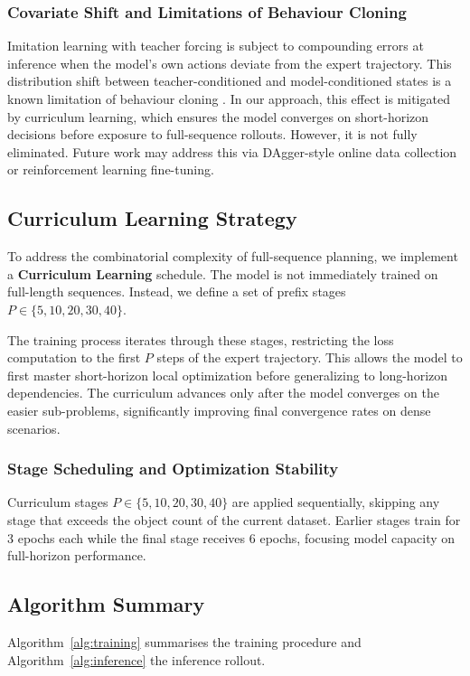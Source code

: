 \documentclass[conference]{IEEEtran}
\begin{document}
\subsubsection{Covariate Shift and Limitations of Behaviour Cloning}
Imitation learning with teacher forcing is subject to compounding errors at inference when the model's own actions deviate from the expert trajectory. This distribution shift between teacher-conditioned and model-conditioned states is a known limitation of behaviour cloning \cite{ross2011dagger}. In our approach, this effect is mitigated by curriculum learning, which ensures the model converges on short-horizon decisions before exposure to full-sequence rollouts. However, it is not fully eliminated. Future work may address this via DAgger-style online data collection \cite{ross2011dagger} or reinforcement learning fine-tuning.

\subsection{Curriculum Learning Strategy}
To address the combinatorial complexity of full-sequence planning, we implement a \textbf{Curriculum Learning} schedule. The model is not immediately trained on full-length sequences. Instead, we define a set of prefix stages $P \in \{5, 10, 20, 30, 40\}$.

The training process iterates through these stages, restricting the loss computation to the first $P$ steps of the expert trajectory. This allows the model to first master short-horizon local optimization before generalizing to long-horizon dependencies. The curriculum advances only after the model converges on the easier sub-problems, significantly improving final convergence rates on dense scenarios.

\subsubsection{Stage Scheduling and Optimization Stability}
Curriculum stages $P \in \{5,10,20,30,40\}$ are applied sequentially, skipping any stage that exceeds the object count of the current dataset.
Earlier stages train for 3 epochs each while the final stage receives 6 epochs, focusing model capacity on full-horizon performance.

\subsection{Algorithm Summary}
Algorithm~\ref{alg:training} summarises the training procedure and Algorithm~\ref{alg:inference} the inference rollout.
\end{document}
